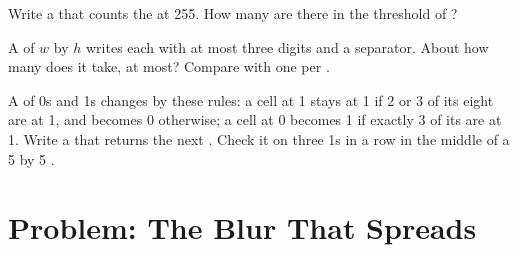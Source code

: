 \begin{exercise}[$\star\star\star$]\label{exo:g9:grids-and-images:10}
Write a   that counts the  at 255. How
many are there in the threshold of ?
\end{exercise}

\begin{exercise}[$\star\star\star$]\label{exo:g9:grids-and-images:11}
A  of $w$ by $h$  writes each  with at most three
digits and a separator. About how many  does it take, at most? Compare
with one  per .
\end{exercise}

\begin{exercise}[$\star\star\star$]\label{exo:g9:grids-and-images:12}
A  of 0s and 1s changes by these rules: a cell at 1 stays at 1 if 2 or 3 of
its eight  are at 1, and becomes 0 otherwise; a cell at 0 becomes 1 if
exactly 3 of its  are at 1. Write a   that
returns the next . Check it on three 1s in a row in the middle of a 5 by 5
.
\end{exercise}

\section{Problem: The Blur That Spreads}

